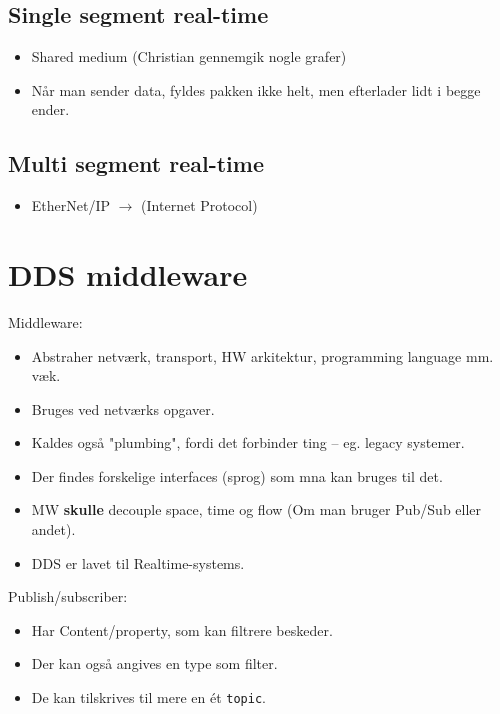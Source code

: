\documentclass[oneside, 10pt]{article}
\begin{document}
\subsection{Single segment real-time}

\begin{itemize}
	\item Shared medium (Christian gennemgik nogle grafer)
	\item Når man sender data, fyldes pakken ikke helt, men efterlader lidt i begge ender.
\end{itemize}

\subsection{Multi segment real-time}
\begin{itemize}
	\item EtherNet/IP $\rightarrow$ (Internet Protocol)
\end{itemize}







\newpage
\section{DDS middleware}

Middleware:
\begin{itemize}
	\item Abstraher netværk, transport, HW arkitektur, programming language mm. væk.
	\item Bruges ved netværks opgaver.
	\item Kaldes også "plumbing", fordi det forbinder ting -- eg. legacy systemer.
	\item Der findes forskelige interfaces (sprog) som mna kan bruges til det.
	\item MW \textbf{skulle} decouple space, time og flow (Om man bruger Pub/Sub eller andet).
	\item DDS er lavet til Realtime-systems.
\end{itemize}

Publish/subscriber:
\begin{itemize}
	\item Har Content/property, som kan filtrere beskeder.
	\item Der kan også angives en type som filter.
	\item De kan tilskrives til mere en ét \texttt{topic}.
\end{itemize}
\end{document}
